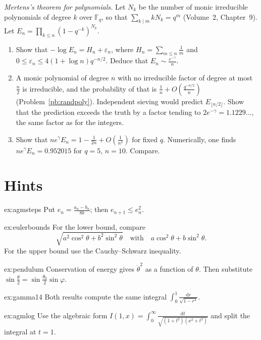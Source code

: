 \begin{exercise}[$\star\star$]\label{pb:polymertens}
\emph{Mertens's theorem for polynomials.} Let $N_k$ be the number of monic irreducible polynomials of degree $k$ over $\mathbb F_q$, so that
$\sum_{k\mid m}kN_k=q^m$ (Volume~2, Chapter~9). Let $E_n=\prod_{k\le n}(1-q^{-k})^{N_k}$.
\begin{enumerate}[label=(\alph*)]
\item Show that $-\log E_n=H_n+\varepsilon_n$, where $H_n=\sum_{m\le n}\frac1m$ and $0\le\varepsilon_n\le4(1+\log n)q^{-n/2}$. Deduce that $E_n\sim\frac{e^{-\gamma}}n$.
\item A monic polynomial of degree $n$ with no irreducible factor of degree at most $\frac n2$ is irreducible, and the probability of that is $\frac1n+O(\frac{q^{-n/2}}n)$
(Problem~\ref{pb:randpoly}). Independent sieving would predict $E_{\lfloor n/2\rfloor}$. Show that the prediction exceeds the truth by a factor tending to $2e^{-\gamma}=1.1229\ldots$, the same factor as for the integers.
\item Show that $ne^\gamma E_n=1-\frac1{2n}+O(\frac1{n^2})$ for fixed $q$. Numerically, one finds $ne^\gamma E_n=0.952015$ for $q=5$, $n=10$. Compare.
\end{enumerate}
\end{exercise}

\section{Hints}

\begin{hint}{ex:agmsteps}
Put $e_n=\frac{a_n-b_n}{8b}$; then $e_{n+1}\le e_n^2$.
\end{hint}
\begin{hint}{ex:eulerbounds}
For the lower bound, compare
\[
\sqrt{a^2\cos^2\theta+b^2\sin^2\theta}
\quad\text{with}\quad a\cos^2\theta+b\sin^2\theta.
\]
For the upper bound use the Cauchy--Schwarz inequality.
\end{hint}
\begin{hint}{ex:pendulum}
Conservation of energy gives $\dot\theta^2$ as a function of $\theta$. Then substitute $\sin\frac\theta2=\sin\frac{\theta_0}2\sin\varphi$.
\end{hint}
\begin{hint}{ex:gamma14}
Both results compute the same integral $\int_0^1\frac{\mathrm dr}{\sqrt{1-r^4}}$.
\end{hint}
\begin{hint}{ex:agmlog}
Use the algebraic form $I(1,x)=\int_0^\infty\frac{\mathrm dt}{\sqrt{(1+t^2)(x^2+t^2)}}$ and split the integral at $t=1$.
\end{hint}

